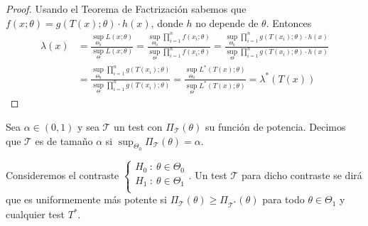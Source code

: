 \begin{proof}
Usando el Teorema de Factrización sabemos que $f(x;\theta) = g(T(x);\theta) \cdot h(x)$, donde $h$ no depende de $\theta$. Entonces
\begin{align*}
    \lambda(x) &= \frac{\sup_{\Theta_0}L(x;\theta)}{\sup_{\Theta}L(x;\theta)} = \frac{\sup_{\Theta_0} \prod_{i=1}^{n}f(x_i;\theta)}{\sup_{\Theta} \prod_{i=1}^{n}f(x_i;\theta)} = \frac{\sup_{\Theta_0} \prod_{i=1}^{n}g(T(x_i);\theta) \cdot h(x)}{\sup_{\Theta} \prod_{i=1}^{n}g(T(x_i);\theta) \cdot h(x)} \\
    &= \frac{\sup_{\Theta_0} \prod_{i=1}^{n}g(T(x_i);\theta)}{\sup_{\Theta} \prod_{i=1}^{n}g(T(x_i);\theta)} = \frac{\sup_{\Theta_0}L^*(T(x);\theta)}{\sup_{\Theta}L^*(T(x);\theta)} = \lambda^*(T(x))
\end{align*}
\end{proof}

\begin{defi}
Sea $\alpha \in (0,1)$ y sea $\mathcal{T}$ un test con $\Pi_{\mathcal{T}}(\theta)$ su función de potencia. Decimos que $\mathcal{T}$ es de tamaño $\alpha$ si $\sup_{\Theta_0} \Pi_{\mathcal{T}}(\theta) = \alpha$.
\end{defi}

\begin{defi}
Consideremos el contraste $
    \left\{ \begin{array}{lcc}
             H_0 \ : \ \theta \in \Theta_0\\
             H_1 \ : \ \theta \in \Theta_1 \\
             \end{array}
   \right.
$. Un test $\mathcal{T}$ para dicho contraste se dirá que es uniformemente más potente si $\Pi_{\mathcal{T}}(\theta) \ge \Pi_{\mathcal{T^*}}(\theta)$ para todo $\theta \in \Theta_1$ y cualquier test $T^*$.
\end{defi}

